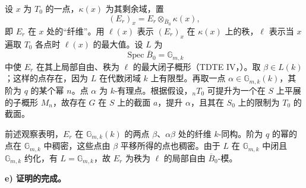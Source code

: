 
设 \(x\) 为 \(T_0\) 的一点，\(\kappa(x)\) 为其剩余域，置
\[
  (E_r)_x=E_r\otimes_{\overline B_0}\kappa(x),
\]
即 \(E_r\) 在 \(x\) 处的“纤维”。用 \(\ell(x)\) 表示 \((E_r)_x\) 在 \(\kappa(x)\) 上的秩，\(\ell\) 表示当 \(x\) 遍取 \(T_0\) 各点时 \(\ell(x)\) 的最大值。设 \(L\) 为
\[
  \operatorname{Spec}\overline B_0=\mathbb G_{m,k}
\]
中使 \(E_r\) 在其上局部自由、秩为 \(\ell\) 的最大闭子概形（TDTE IV，）。取 \(\beta\in L(k)\)；这样的点存在，因为 \(L\) 在代数闭域 \(k\) 上有限型。再取一点 \(\alpha\in\mathbb G_{m,k}(k)\)，其阶为 \(q\) 的某个幂 \(n\)。点 \(\alpha\) 为 \(k\)-有理点。根据假设，\({}_nT_0\) 可提升为一个在 \(S\) 上平展的子概形 \(M_n\)，故存在 \(G\) 在 \(S\) 上的截面 \(a\)，提升 \(\alpha\)，且其在 \(S_0\) 上的限制为 \(T_0\) 的截面。

前述观察表明，\(E_r\) 在 \(\mathbb G_{m,k}(k)\) 的两点 \(\beta\)、\(\alpha\beta\) 处的纤维 \(k\)-同构。阶为 \(q\) 的幂的点在 \(\mathbb G_{m,k}\) 中稠密，这些点由 \(\beta\) 平移所得的点也稠密。由于 \(L\) 在 \(\mathbb G_{m,k}\) 中闭且 \(\mathbb G_{m,k}\) 约化，有 \(L=\mathbb G_{m,k}\)，故 \(E_r\) 为秩为 \(\ell\) 的局部自由 \(\overline B_0\)-模。

\medskip\noindent\textbf{e)  证明的完成。}

